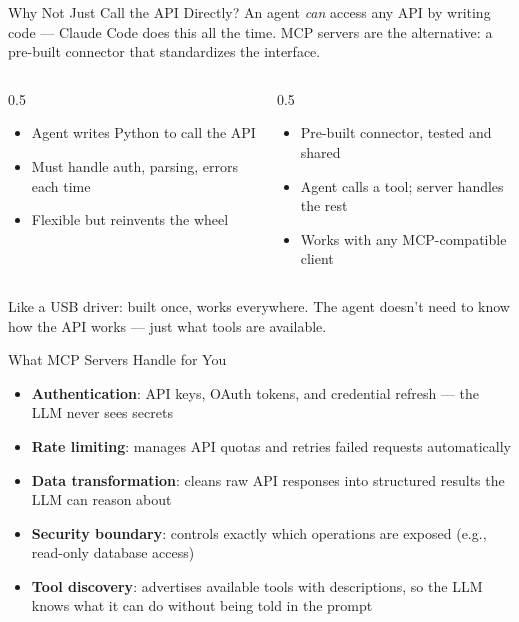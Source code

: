 \documentclass[aspectratio=169]{beamer}
\begin{document}
\begin{frame}{Why Not Just Call the API Directly?}
An agent \textit{can} access any API by writing code --- Claude Code does this all the time.  MCP servers are the alternative: a pre-built connector that standardizes the interface.
\vspace{0.3cm}
\begin{columns}[T]
\begin{column}{0.5\textwidth}
\begin{shadedbox}[title=\textbf{Direct API Access}]
\begin{itemize}\small
  \item Agent writes Python to call the API
  \item Must handle auth, parsing, errors each time
  \item Flexible but reinvents the wheel
\end{itemize}
\end{shadedbox}
\end{column}
\begin{column}{0.5\textwidth}
\begin{shadedbox}[title=\textbf{MCP Server}]
\begin{itemize}\small
  \item Pre-built connector, tested and shared
  \item Agent calls a tool; server handles the rest
  \item Works with any MCP-compatible client
\end{itemize}
\end{shadedbox}
\end{column}
\end{columns}
\vspace{0.3cm}
Like a USB driver: built once, works everywhere.  The agent doesn't need to know how the API works --- just what tools are available.
\end{frame}

\begin{frame}{What MCP Servers Handle for You}
\begin{itemize}
  \item \textbf{Authentication}: API keys, OAuth tokens, and credential refresh --- the LLM never sees secrets
  \item \textbf{Rate limiting}: manages API quotas and retries failed requests automatically
  \item \textbf{Data transformation}: cleans raw API responses into structured results the LLM can reason about
  \item \textbf{Security boundary}: controls exactly which operations are exposed (e.g., read-only database access)
  \item \textbf{Tool discovery}: advertises available tools with descriptions, so the LLM knows what it can do without being told in the prompt
\end{itemize}
\end{frame}
\end{document}
